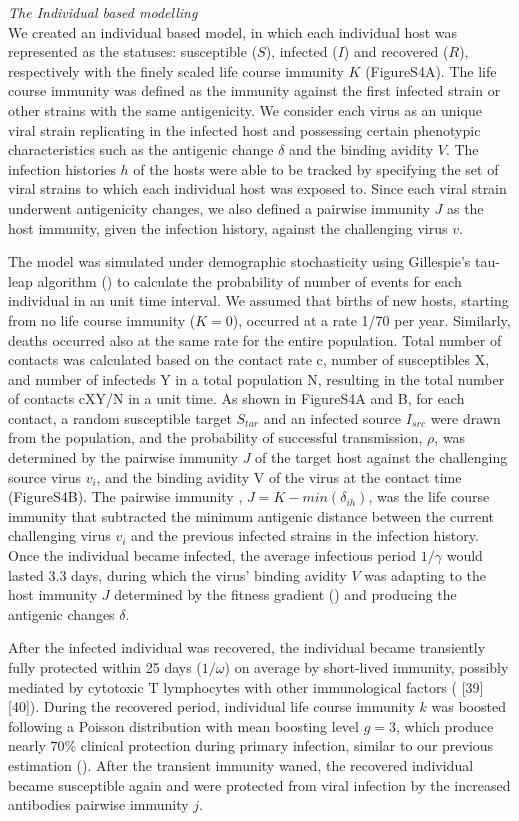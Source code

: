 \documentclass[12pt,a4paper]{article}
\begin{document}
\textit{The Individual based modelling} \\
We created an individual based model, in which each individual host was represented as the statuses: susceptible ($S$), infected ($I$) and recovered ($R$), respectively with the finely scaled life course immunity $K$ (FigureS4A). The life course immunity was defined as the immunity against the first infected strain or other strains with the same antigenicity. We consider each virus as an unique viral strain replicating in the infected host and possessing certain phenotypic characteristics such as the antigenic change $\delta$ and the binding avidity $V$. The infection histories $h$ of the hosts were able to be tracked by specifying the set of viral strains to which each individual host was exposed to. Since each viral strain underwent antigenicity changes, we also defined a pairwise immunity $J$ as the host immunity, given the infection history, against the challenging virus $v$.

The model was simulated under demographic stochasticity using Gillespie’s tau-leap algorithm (\cite{Gillespie2001}) to calculate the probability of number of events for each individual in an unit time interval. We assumed that births of new hosts, starting from no life course immunity ($K = 0$), occurred at a rate 1/70 per year. Similarly, deaths occurred also at the same rate for the entire population. Total number of contacts was calculated based on the contact rate c, number of susceptibles X, and number of infecteds Y in a total population N, resulting in the total number of contacts cXY/N in a unit time. As shown in FigureS4A and B, for each contact, a random susceptible target $S_{tar}$ and an infected source $I_{src}$ were drawn from the population, and the probability of successful transmission, $\rho$, was determined by the pairwise immunity $J$ of the target host against the challenging source virus $v_{i}$, and the binding avidity V of the virus at the contact time (FigureS4B). The pairwise immunity , $J =K - min(\delta_{ih})$, was the life course immunity that subtracted the minimum antigenic distance between the current challenging virus $v_{i}$ and the previous infected strains in the infection history. Once the individual became infected, the average infectious period $1/\gamma$ would lasted 3.3 days, during which the virus’ binding avidity $V$ was adapting to the host immunity $J$ determined by the fitness gradient (\cite{Yuan2013}) and producing the antigenic changes $\delta$.

After the infected individual was recovered, the individual became transiently fully protected within 25 days ($1/\omega$) on average by short-lived immunity, possibly mediated by cytotoxic T lymphocytes with other immunological factors ( [39] [40]). During the recovered period, individual life course immunity $k$ was boosted following a Poisson distribution with mean boosting level $g=3$, which produce nearly $70\%$ clinical protection during primary infection, similar to our previous estimation (\cite{Yuan2016}). After the transient immunity waned, the recovered individual became susceptible again and were protected from viral infection by the increased antibodies pairwise immunity $j$.
\end{document}
